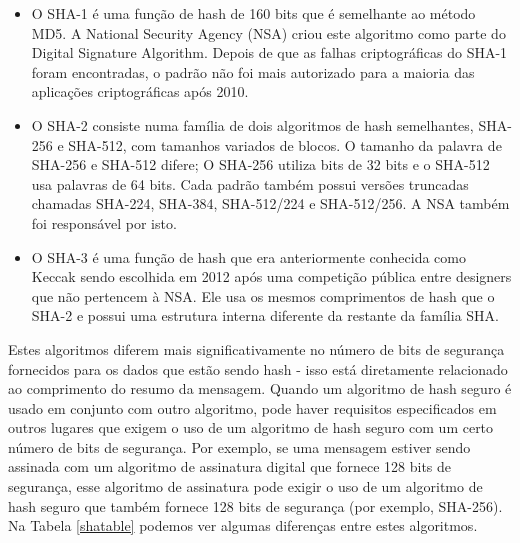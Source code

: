 \documentclass[conference]{IEEEtran}
\begin{document}
\begin{itemize}
\item O SHA-1 é uma função de hash de 160 bits que é semelhante ao método MD5. A National Security Agency 
(NSA) criou este algoritmo como parte do Digital Signature Algorithm. Depois de que as falhas 
criptográficas do SHA-1 foram encontradas, o padrão não foi mais autorizado para a maioria das 
aplicações criptográficas após 2010.
\item O SHA-2 consiste numa família de dois algoritmos de hash semelhantes, SHA-256 e SHA-512, com tamanhos 
variados de blocos. O tamanho da palavra de SHA-256 e SHA-512 difere; O SHA-256 utiliza bits de 
32 bits e o SHA-512 usa palavras de 64 bits. Cada padrão também possui versões truncadas chamadas 
SHA-224, SHA-384, SHA-512/224 e SHA-512/256. A NSA também foi responsável por isto.
\item O SHA-3 é uma função de hash que era anteriormente conhecida como Keccak sendo escolhida 
em 2012 após uma competição pública entre designers que não pertencem à NSA. Ele usa os mesmos 
comprimentos de hash que o SHA-2 e possui uma estrutura interna diferente da restante da família SHA.
\end{itemize} \cite{SHA2022}

Estes algoritmos diferem mais significativamente no número de bits de segurança fornecidos para os dados 
que estão sendo hash - isso está diretamente relacionado ao comprimento do resumo da mensagem. Quando um 
algoritmo de hash seguro é usado em conjunto com outro algoritmo, pode haver requisitos especificados 
em outros lugares que exigem o uso de um algoritmo de hash seguro com um certo número de bits de segurança. 
Por exemplo, se uma mensagem estiver sendo assinada com um algoritmo de assinatura digital que fornece 
128 bits de segurança, esse algoritmo de assinatura pode exigir o uso de um algoritmo de hash seguro que 
também fornece 128 bits de segurança (por exemplo, SHA-256).
Na Tabela \ref{shatable} podemos ver algumas diferenças entre estes algoritmos.
\end{document}
